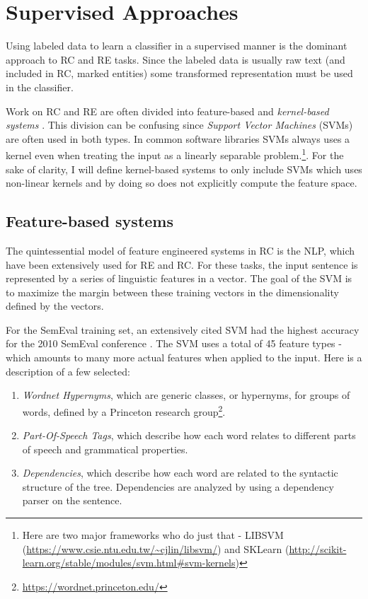 
\section{Supervised Approaches}

Using labeled data to learn a classifier in a supervised manner is the dominant approach to RC and RE tasks. Since the labeled data is usually raw text (and included in RC, marked entities) some transformed representation must be used in the classifier.    

Work on RC and RE are often divided into feature-based and \emph{kernel-based systems} \cite{re_cnn} \cite{zeng2014}. This division can be confusing since \emph{Support Vector Machines} (SVMs) are often used in both types. In common software libraries SVMs always uses a kernel even when treating the input as a linearly separable problem.\footnote{Here are two major frameworks who do just that - LIBSVM (\url{https://www.csie.ntu.edu.tw/~cjlin/libsvm/}) and SKLearn (\url{http://scikit-learn.org/stable/modules/svm.html\#svm-kernels})}. For the sake of clarity, I will define kernel-based systems to only include SVMs which uses non-linear kernels and by doing so does not explicitly compute the feature space.

\subsection{Feature-based systems}

The quintessential model of feature engineered systems in RC is the NLP, %
which have been extensively used for RE and RC. For these tasks, the input sentence is represented by a series 
of linguistic features in a vector. The goal of the SVM is to maximize the margin between these training vectors in the dimensionality defined by the vectors. 

For the SemEval training set, an extensively cited SVM had the highest accuracy for the 2010 SemEval conference \cite{semevalSVM}. The SVM uses a total of 45 feature types - which amounts to many more actual features when applied to the input. Here is a description of a few selected:

\begin{enumerate}

\item \emph{Wordnet Hypernyms}, which are generic classes, or hypernyms, for groups of words, defined by a Princeton research group\footnote{\url{https://wordnet.princeton.edu/}}.

\item \emph{Part-Of-Speech Tags}, which describe how each word relates to different parts of speech and grammatical properties.

\item \emph{Dependencies}, which describe how each word are related to the syntactic structure of the tree. Dependencies are analyzed by using a dependency parser on the sentence.
\end{enumerate} 

